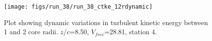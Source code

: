 \begin{figure}[H]
\centering
\texttt{[image: figs/run\_38/run\_38\_ctke\_12rdynamic]}
\caption{Plot showing dynamic variations in turbulent kinetic energy between 1 and 2 core radii. $z/c$=8.50, $V_{free}$=28.81, station 4.}
\label{fig:run_38_ctke_12rdynamic}
\end{figure}


